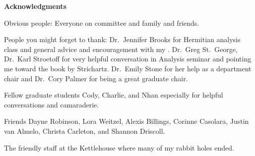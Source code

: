 
{\bf {\Large Acknowledgments}} \hfill

\begin{com}
  Obvious people: Everyone on committee and family and friends.

  People you might forget to thank: 
  Dr.~Jennifer Brooks for Hermitian analysis class and general advice and encouragement with my .
  Dr.~Greg St.~George, Dr.~Karl Stroetoff for very helpful conversation in Analysis seminar and pointing me toward the book by Strichartz.
  Dr.~Emily Stone for her help as a department chair and Dr.~Cory Palmer for being a great graduate chair.

  Fellow graduate students Cody, Charlie, and Nhan especially for helpful conversations and camaraderie.

  Friends Dayne Robinson, Lora Weitzel, Alexis Billings, Corinne Casolara, Justin van Almelo, Christa Carleton, and Shannon Driscoll.

  The friendly staff at the Kettlehouse where many of my rabbit holes ended.
\end{com}
